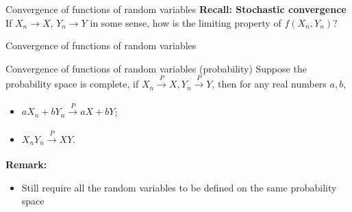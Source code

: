 \documentclass [aspectratio=169]{beamer}
\begin{document}
\begin{frame}{Convergence of functions of random variables}
    \textbf{Recall: Stochastic convergence}
    If $X_n \to X$, $Y_n \to Y$ in some sense, how is the limiting property of $f(X_n, Y_n)$?
    \vspace{0.1in}
\vspace{0.2in}
\end{frame}


\begin{frame}{Convergence of functions of random variables}
    \begin{block}{Convergence of functions of random variables (probability)}
     Suppose the probability space is complete, if $X_n  \xrightarrow[]{P} X, Y_n  \xrightarrow[]{P} Y$, then for any real numbers $a, b$, \begin{itemize}
        \item $aX_n + bY_n  \xrightarrow[]{P} aX + bY$;
        \item $X_n Y_n  \xrightarrow[]{P} XY$.
    \end{itemize}
    \end{block}
    \vspace{0.1in}
    \textbf{Remark:}
    \begin{itemize}
        \item Still require all the random variables to be defined on the same probability space
        
    \end{itemize}
\end{frame}
\end{document}
